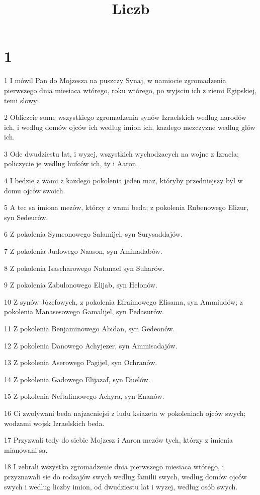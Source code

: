 

\title{Liczb}


\chapter{1}

\par 1 I mówil Pan do Mojzesza na puszczy Synaj, w namiocie zgromadzenia pierwszego dnia miesiaca wtórego, roku wtórego, po wyjsciu ich z ziemi Egipskiej, temi slowy:
\par 2 Obliczcie sume wszystkiego zgromadzenia synów Izraelskich wedlug narodów ich, i wedlug domów ojców ich wedlug imion ich, kazdego mezczyzne wedlug glów ich.
\par 3 Ode dwudziestu lat, i wyzej, wszystkich wychodzacych na wojne z Izraela; policzycie je wedlug hufców ich, ty i Aaron.
\par 4 I bedzie z wami z kazdego pokolenia jeden maz, któryby przedniejszy byl w domu ojców swoich.
\par 5 A tec sa imiona mezów, którzy z wami beda; z pokolenia Rubenowego Elizur, syn Sedeurów.
\par 6 Z pokolenia Symeonowego Salamijel, syn Surysaddajów.
\par 7 Z pokolenia Judowego Naason, syn Aminadabów.
\par 8 Z pokolenia Isascharowego Natanael syn Suharów.
\par 9 Z pokolenia Zabulonowego Elijab, syn Helonów.
\par 10 Z synów Józefowych, z pokolenia Efraimowego Elisama, syn Ammiudów; z pokolenia Manasesowego Gamalijel, syn Pedasurów.
\par 11 Z pokolenia Benjaminowego Abidan, syn Gedeonów.
\par 12 Z pokolenia Danowego Achyjezer, syn Ammisadajów.
\par 13 Z pokolenia Aserowego Pagijel, syn Ochranów.
\par 14 Z pokolenia Gadowego Elijazaf, syn Duelów.
\par 15 Z pokolenia Neftalimowego Achyra, syn Enanów.
\par 16 Ci zwolywani beda najzacniejsi z ludu ksiazeta w pokoleniach ojców swych; wodzami wojsk Izraelskich beda.
\par 17 Przyzwali tedy do siebie Mojzesz i Aaron mezów tych, którzy z imienia mianowani sa.
\par 18 I zebrali wszystko zgromadzenie dnia pierwszego miesiaca wtórego, i przyznawali sie do rodzajów swych wedlug familii swych, wedlug domów ojców swych i wedlug liczby imion, od dwudziestu lat i wyzej, wedlug osób swych.
